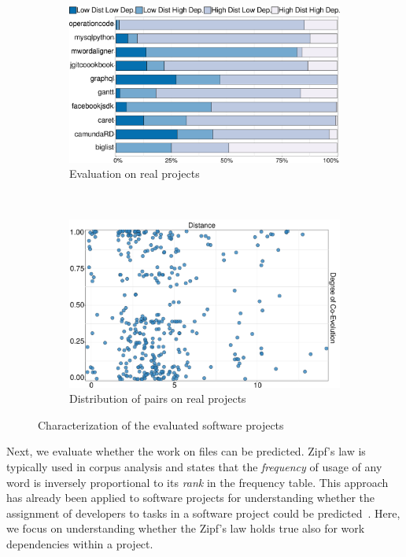 \begin{figure}[t]
	\begin{subfigure}[b]{.51\textwidth}
		\centering
		\includegraphics[width=.98\linewidth]{bpm2017/figures/Project-Analysis-Barchart-crop.pdf}
		\caption{Evaluation on real projects}
		\label{fig:project-analysis}
	\end{subfigure}~
	\begin{subfigure}[b]{.47\textwidth}
		\centering
		\includegraphics[width=.98\linewidth]{bpm2017/figures/Co-EvolutionVSDistance-OneColor.pdf}
		\caption{Distribution of pairs on real projects}
		\label{fig:pairs-on-space}
	\end{subfigure}
	\caption{Characterization of the evaluated software projects}
\end{figure}
Next, we evaluate whether the work on files can be predicted. Zipf's law is typically used in corpus analysis and states that the \emph{frequency} of usage of any word is inversely proportional to its \emph{rank} in the frequency table. This approach has already been applied to software projects for understanding whether the assignment of developers to tasks in a software project could be predicted~\citep{Canfora2006}. Here, we focus on understanding whether the Zipf's law holds true also for work dependencies within a project. 

